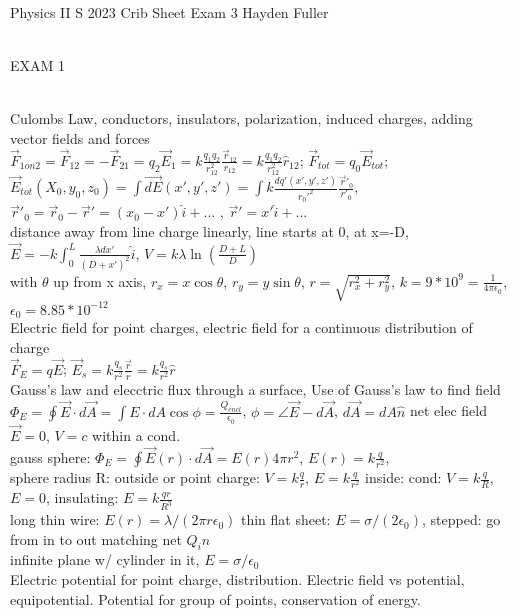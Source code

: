 \documentclass{article}
\begin{document}
Physics II S 2023 Crib Sheet Exam 3 Hayden Fuller
\begin{large}
\begin{Large}\\EXAM 1\end{Large}
\\\indent Culombs Law, conductors, insulators, polarization, induced charges, adding vector fields and forces
\\$\vec F_{1on2}=\vec F_{12}=-\vec{F}_{21}=q_2\vec{E}_1=k\frac{q_1q_2}{r_{12}^2}\frac{\vec{r}_{12}}{r_{12}}=k\frac{q_1q_2}{r_{12}^2}\hat r_{12}$; $\vec{F}_{tot}=q_0\vec{E}_{tot}$; $\vec{E}_{tot}(X_0,y_0,z_0)=\int \vec{dE}(x',y',z')=\int k\frac{dq'(x',y',z')}{r_0'^2}\frac{\vec{r}'_0}{r'_0}$, $\vec{r}'_0=\vec{r}_0-\vec{r}'=(x_0-x')\hat i+$... , $\vec{r}'=x'\hat i +$...
\\distance away from line charge linearly, line starts at 0, at x=-D, $\vec{E}=-k\int_0^L\frac{\lambda dx'}{(D+x')^2}\hat i$, $V=k\lambda\ln(\frac{D+L}{D})$
\\with $\theta$ up from x axis, $r_x=x\cos\theta$, $r_y=y\sin\theta$, $r=\sqrt{r_x^2+r_y^2}$, $k=9*10^9=\frac{1}{4\pi \epsilon_0}$, $\epsilon_0=8.85*10^{-12}$
\\\indent Electric field for point charges, electric field for a continuous distribution of charge
\\$\vec{F}_E=q\vec{E}$; $\vec{E}_s=k\frac{q_s}{r^2}\frac{\vec{r}}{r}=k\frac{q_s}{r^2}\hat r$
\\\indent Gauss's law and elecctric flux through a surface, Use of Gauss's law to find field
\\$\Phi_E=\oint\vec{E}\cdot d\vec{A}=\int E \cdot dA \cos \phi=\frac{Q_{encl}}{\epsilon_0}$, $\phi=\angle \vec E-d\vec A$, $d\vec A= dA\hat n$ net elec field $\vec{E}=0$, $V=c$ within a cond.
\\gauss sphere: $\Phi_E=\oint\vec E (r)\cdot d\vec A=E(r)4\pi r^2$, $E(r)=k\frac{q}{r^2}$,
\\sphere radius R: outside or point charge: $V=k\frac{q}{r}$, $E=k \frac{q}{r^2}$ inside: cond: $V=k\frac{q}{R}$, $E=0$, insulating: $E=k\frac{qr}{R^3}$
\\long thin wire: $E(r)=\lambda/(2\pi r\epsilon_0)$ \quad thin flat sheet: $E=\sigma/(2\epsilon_0)$, stepped: go from in to out matching net $Q_in$
\\infinite plane w/ cylinder in it, $E=\sigma/\epsilon_0$
\\\indent Electric potential for point charge, distribution. Electric field vs potential, equipotential. Potential for group of points, conservation of energy.

\end{large}
\end{document}
